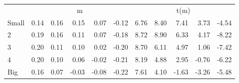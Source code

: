 \begin{table}[!ht]
\begin{tabular}{lrrrrrrrrrr}
      & \multicolumn{5}{c}{m} & \multicolumn{5}{c}{t(m)}
    
    \\
      \cmidrule(r){2-6} \cmidrule(r){7-11}

    Small   & 0.14  & 0.16  & 0.15  & 0.07  & -0.12  & 6.76  & 8.40  & 7.41  & 3.73  & -4.54  \\
         2  & 0.19  & 0.16  & 0.11  & 0.07  & -0.18  & 8.72  & 8.90  & 6.33  & 4.17  & -8.22  \\
         3  & 0.20  & 0.11  & 0.10  & 0.02  & -0.20  & 8.70  & 6.11  & 4.97  & 1.06  & -7.42  \\
         4  & 0.20  & 0.10  & 0.06  & -0.02  & -0.21  & 8.19  & 4.88  & 2.95  & -0.76  & -6.22  \\
    Big     & 0.16  & 0.07  & -0.03  & -0.08  & -0.22  & 7.61  & 4.10  & -1.63  & -3.26  & -5.48  \\

  

  \bottomrule
\end{tabular}
\label{tbl:25_Size_Beta_C97b}
\end{table}